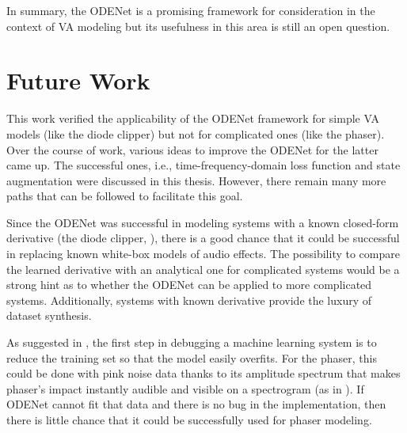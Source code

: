 In summary, the ODENet is a promising framework for consideration in the context of \ac{VA} modeling but its usefulness in this area is still an open question.

\section{Future Work}
\label{sec:future_work}

This work verified the applicability of the ODENet framework for simple \ac{VA} models (like the diode clipper) but not for complicated ones (like the phaser). Over the course of work, various ideas to improve the ODENet for the latter came up. The successful ones, i.e., time-frequency-domain loss function and state augmentation were discussed in this thesis. However, there remain many more paths that can be followed to facilitate this goal.

Since the ODENet was successful in modeling systems with a known closed-form derivative (the diode clipper, \cite{Chen2018,Karlsson2019}), there is a good chance that it could be successful in replacing known white-box models of audio effects. The possibility to compare the learned derivative with an analytical one for complicated systems would be a strong hint as to whether the ODENet can be applied to more complicated systems. Additionally, systems with known derivative provide the luxury of dataset synthesis.

As suggested in \cite{Bengio2012}, the first step in debugging a machine learning system is to reduce the training set so that the model easily overfits. For the phaser, this could be done with pink noise data thanks to its amplitude spectrum that makes phaser's impact instantly audible and visible on a spectrogram (as in ). If ODENet cannot fit that data and there is no bug in the implementation, then there is little chance that it could be successfully used for phaser modeling.

